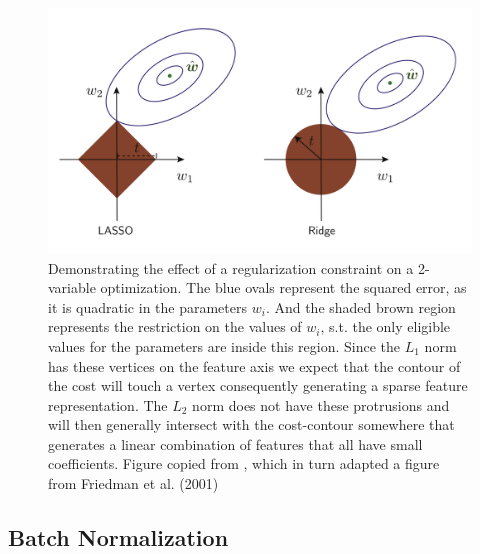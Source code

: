 \begin{figure}
\centering
\includegraphics[width=\textwidth]{../figures/regularization}
\caption[Geometric interpretation of the $L_1$ and $L_2$ regularization and the squared error cost]{Demonstrating the effect of a regularization constraint on a 2-variable optimization. The blue ovals represent the squared error, as it is quadratic in the parameters $w_i$. And the shaded brown region represents the restriction on the values of $w_i$, s.t. the only eligible values for the parameters are inside this region. Since the $L_1$ norm has these vertices on the feature axis we expect that the contour of the cost will touch a vertex consequently generating a sparse feature representation. The $L_2$ norm does not have these protrusions and will then generally intersect with the cost-contour somewhere that generates a linear combination of features that all have small coefficients. Figure copied from \citet{Mehta2019}, which in turn adapted a figure from Friedman et al. (2001)}\label{fig:regularization}
\end{figure}

\subsection{Batch Normalization}\label{sec:batchnorm}
